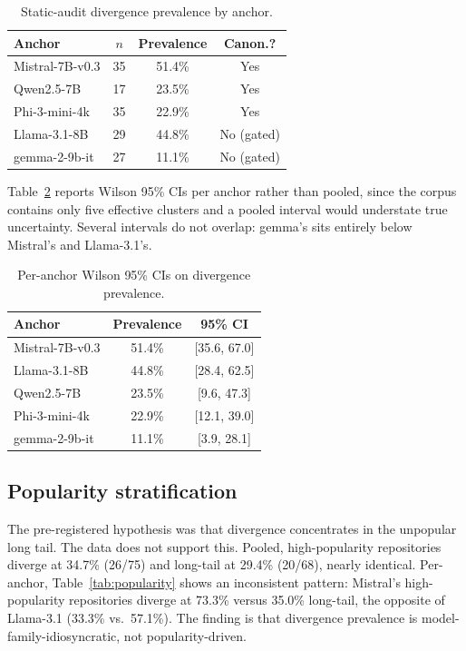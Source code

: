 \documentclass[letterpaper,twocolumn,10pt]{article}
\begin{document}
\begin{table}[t]
\caption{Static-audit divergence prevalence by anchor.}
\label{tab:prevalence}
\centering
\small
\begin{tabular}{lccc}
\toprule
Anchor & $n$ & Prevalence & Canon.? \\
\midrule
Mistral-7B-v0.3 & 35 & 51.4\% & Yes \\
Qwen2.5-7B & 17 & 23.5\% & Yes \\
Phi-3-mini-4k & 35 & 22.9\% & Yes \\
Llama-3.1-8B & 29 & 44.8\% & No (gated) \\
gemma-2-9b-it & 27 & 11.1\% & No (gated) \\
\bottomrule
\end{tabular}
\end{table}

Table~\ref{tab:ci} reports Wilson 95\% CIs per anchor rather than pooled, since the corpus contains only five effective clusters and a pooled interval would understate true uncertainty. Several intervals do not overlap: gemma's sits entirely below Mistral's and Llama-3.1's.

\begin{table}[t]
\caption{Per-anchor Wilson 95\% CIs on divergence prevalence.}
\label{tab:ci}
\centering
\small
\begin{tabular}{lcc}
\toprule
Anchor & Prevalence & 95\% CI \\
\midrule
Mistral-7B-v0.3 & 51.4\% & [35.6, 67.0] \\
Llama-3.1-8B & 44.8\% & [28.4, 62.5] \\
Qwen2.5-7B & 23.5\% & [9.6, 47.3] \\
Phi-3-mini-4k & 22.9\% & [12.1, 39.0] \\
gemma-2-9b-it & 11.1\% & [3.9, 28.1] \\
\bottomrule
\end{tabular}
\end{table}

\subsection{Popularity stratification}

The pre-registered hypothesis was that divergence concentrates in the unpopular long tail. The data does not support this. Pooled, high-popularity repositories diverge at 34.7\% (26/75) and long-tail at 29.4\% (20/68), nearly identical. Per-anchor, Table~\ref{tab:popularity} shows an inconsistent pattern: Mistral's high-popularity repositories diverge at 73.3\% versus 35.0\% long-tail, the opposite of Llama-3.1 (33.3\% vs.\ 57.1\%). The finding is that divergence prevalence is model-family-idiosyncratic, not popularity-driven.
\end{document}
